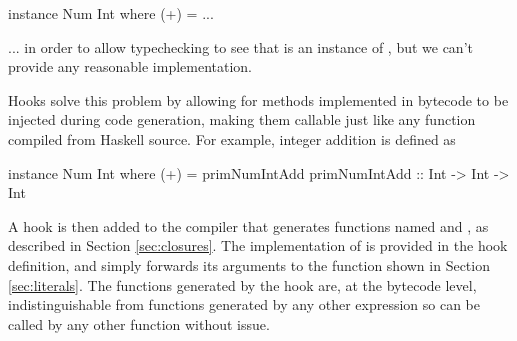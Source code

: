 \documentclass[dissertation.tex]{subfiles}
\begin{document}
{{        \begin{haskellfigure}
        instance Num Int where
            (+) = ...
        \end{haskellfigure}

        ... in order to allow typechecking to see that  is an instance of , but we can't
        provide any reasonable implementation.

        Hooks solve this problem by allowing for methods implemented in bytecode to be injected during code
        generation, making them callable just like any function compiled from Haskell source. For example, integer
        addition is defined as 

        \begin{haskellfigure}
        instance Num Int where
            (+) = primNumIntAdd
        primNumIntAdd :: Int -> Int -> Int
        \end{haskellfigure}

        A hook is then added to the compiler that generates functions named  and
        , as described in Section \ref{sec:closures}. The implementation of
         is provided in the hook definition, and simply forwards its arguments to the
         function shown in Section \ref{sec:literals}. The functions generated by the hook are, at the
        bytecode level, indistinguishable from functions generated by any other expression so can be called by any
        other function without issue.

    }
}
\end{document}
